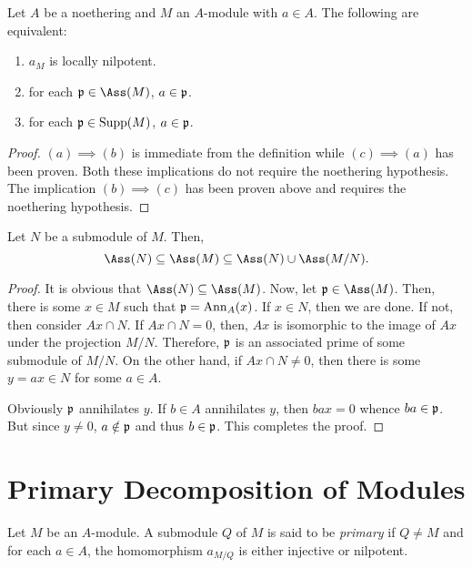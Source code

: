 \begin{corollary}
    Let $A$ be a noethering and $M$ an $A$-module with $a\in A$. The following are equivalent: 
    \begin{enumerate}[label=(\alph*)]
        \item $a_M$ is locally nilpotent. 
        \item for each $\frakp\in\Ass(M)$, $a\in\mathfrak p$.
        \item for each $\mathfrak p\in\operatorname{Supp}(M)$, $a\in\mathfrak p$.
    \end{enumerate}
\end{corollary}
\begin{proof}
    $(a)\implies(b)$ is immediate from the definition while $(c)\implies(a)$ has been proven. Both these implications do not require the noethering hypothesis. The implication $(b)\implies(c)$ has been proven above and requires the noethering hypothesis.
\end{proof}

\begin{lemma}
    Let $N$ be a submodule of $M$. Then, 
    \begin{equation*}
        \Ass(N)\subseteq\Ass(M)\subseteq\Ass(N)\cup\Ass(M/N).
    \end{equation*}
\end{lemma}
\begin{proof}
    It is obvious that $\Ass(N)\subseteq\Ass(M)$. Now, let $\frakp\in\Ass(M)$. Then, there is some $x\in M$ such that $\mathfrak p = \operatorname{Ann}_A(x)$. If $x\in N$, then we are done. If not, then consider $Ax\cap N$. If $Ax\cap N = 0$, then, $Ax$ is isomorphic to the image of $Ax$ under the projection $M/N$. Therefore, $\mathfrak p$ is an associated prime of some submodule of $M/N$. On the other hand, if $Ax\cap N\ne 0$, then there is some $y = ax\in N$ for some $a\in A$. 

    Obviously $\mathfrak p$ annihilates $y$. If $b\in A$ annihilates $y$, then $bax = 0$ whence $ba\in\mathfrak p$. But since $y\ne 0$, $a\notin\mathfrak p$ and thus $b\in\mathfrak p$. This completes the proof.
\end{proof}

\section{Primary Decomposition of Modules}

\begin{definition}
    Let $M$ be an $A$-module. A submodule $Q$ of $M$ is said to be \emph{primary} if $Q\ne M$ and for each $a\in A$, the homomorphism $a_{M/Q}$ is either injective or nilpotent.
\end{definition}


